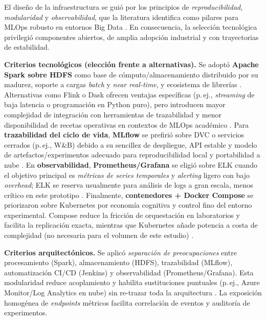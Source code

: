 El diseño de la infraestructura se guió por los principios de \textit{reproducibilidad}, \textit{modularidad} y \textit{observabilidad}, que la literatura identifica como pilares para MLOps robusto en entornos Big Data \citep{Amershi2019,Berberi2025}. En consecuencia, la selección tecnológica privilegió componentes abiertos, de amplia adopción industrial y con trayectorias de estabilidad.

\textbf{Criterios tecnológicos (elección frente a alternativas).}
Se adoptó \textbf{Apache Spark sobre HDFS} como base de cómputo/almacenamiento distribuido por su madurez, soporte a cargas \textit{batch} y \textit{near real-time}, y ecosistema de librerías \citep{Zaharia2016,Meng2020}. Alternativas como Flink o Dask ofrecen ventajas específicas (p.\,ej., \textit{streaming} de baja latencia o programación en Python puro), pero introducen mayor complejidad de integración con herramientas de trazabilidad y menor disponibilidad de recetas operativas en contextos de MLOps académico \citep{Berberi2025}. 
Para \textbf{trazabilidad del ciclo de vida}, \textbf{MLflow} se prefirió sobre DVC o servicios cerrados (p.\,ej., W\&B) debido a su sencillez de despliegue, API estable y modelo de artefactos/experimentos adecuado para reproducibilidad local y portabilidad a nube \citep{Chen2022,Berberi2025}. 
En \textbf{observabilidad}, \textbf{Prometheus/Grafana} se eligió sobre ELK cuando el objetivo principal es \emph{métricas de series temporales} y \emph{alerting} ligero con bajo \textit{overhead}; ELK se reserva usualmente para análisis de logs a gran escala, menos crítico en este prototipo \citep{Zhao2021}.
Finalmente, \textbf{contenedores + Docker Compose} se priorizaron sobre Kubernetes por economía cognitiva y control fino del entorno experimental. Compose reduce la fricción de orquestación en laboratorios y facilita la replicación exacta, mientras que Kubernetes añade potencia a costa de complejidad (no necesaria para el volumen de este estudio) \citep{Merkel2014,Patel2020,Berberi2025}.

\textbf{Criterios arquitectónicos.}
Se aplicó \textit{separación de preocupaciones} entre procesamiento (Spark), almacenamiento (HDFS), trazabilidad (MLflow), automatización CI/CD (Jenkins) y observabilidad (Prometheus/Grafana). Esta modularidad reduce acoplamiento y habilita sustituciones puntuales (p.\,ej., Azure Monitor/Log Analytics en nube) sin re-trazar toda la arquitectura \citep{AzureMonitor2022,Berberi2025}. La exposición homogénea de \emph{endpoints} métricos facilita correlación de eventos y auditoría de experimentos.

